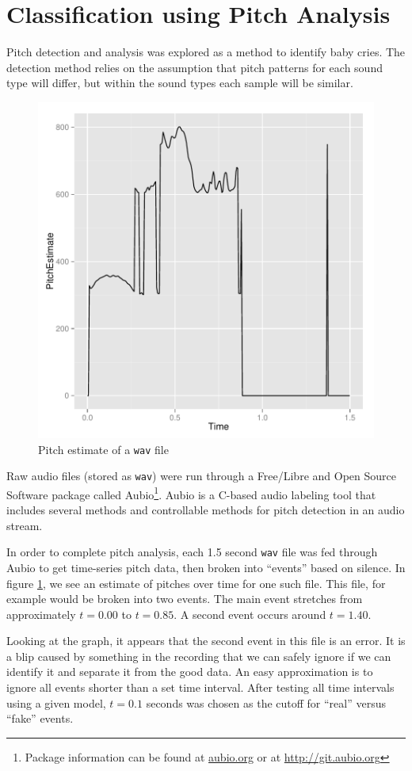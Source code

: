 \documentclass[paper=a4, fontsize=11pt]{scrartcl}
\numberwithin{equation}{section}
\numberwithin{figure}{section}
\numberwithin{table}{section}
\begin{document}
\section{Classification using Pitch Analysis}
Pitch detection and analysis was explored as a method to identify baby cries. The detection method relies on the assumption that pitch patterns for each sound type will differ, but within the sound types each sample will be similar.

\begin{figure}
\begin{center}
\vspace{-20pt}
\includegraphics[width=.38\textwidth]{pitch_time.pdf}
\caption{Pitch estimate of a \texttt{wav} file}\label{fig:aubiograph}
\vspace{-20pt}
\end{center}
\end{figure}

Raw audio files (stored as \texttt{wav}) were run through a Free/Libre and Open Source Software package called Aubio\footnote{Package information can be found at \url{aubio.org} or at \url{http://git.aubio.org}}. Aubio is a C-based audio labeling tool that includes several methods and controllable methods for pitch detection in an audio stream.

In order to complete pitch analysis, each 1.5 second \texttt{wav} file was fed through Aubio to get time-series pitch data, then broken into ``events'' based on silence. In figure \ref{fig:aubiograph}, we see an estimate of pitches over time for one such file. This file, for example would be broken into two events. The main event stretches from approximately $t=0.00$ to $t=0.85$. A second event occurs around $t=1.40$.

Looking at the graph, it appears that the second event in this file is an error. It is a blip caused by something in the recording that we can safely ignore if we can identify it and separate it from the good data. An easy approximation is to ignore all events shorter than a set time interval. After testing all time intervals using a given model, $t=0.1$ seconds was chosen as the cutoff for ``real'' versus ``fake'' events.
\end{document}
